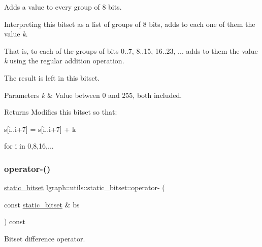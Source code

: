 Adds a value to every group of 8 bits. 

Interpreting this bitset as a list of groups of 8 bits, adds to each one of them the value {\itshape k}.

That is, to each of the groups of bits 0..7, 8..15, 16..23, ... adds to them the value {\itshape k} using the regular addition operation.

The result is left in this bitset. 
\begin{DoxyParams}{Parameters}
{\em k} & Value between 0 and 255, both included. \\
\hline
\end{DoxyParams}
\begin{DoxyReturn}{Returns}
Modifies this bitset so that\+: \begin{DoxyVerb}s[i..i+7] = s[i..i+7] + k
\end{DoxyVerb}
 for i in 0,8,16,... 
\end{DoxyReturn}
\mbox{\label{classlgraph_1_1utils_1_1static__bitset_ab7ab47c906e9e08a61a48bb935594e90}} 
\subsubsection{\texorpdfstring{operator-\/()}{operator-()}}
{\footnotesize\ttfamily \hyperlink{classlgraph_1_1utils_1_1static__bitset}{static\+\_\+bitset} lgraph\+::utils\+::static\+\_\+bitset\+::operator-\/ (\begin{DoxyParamCaption}\item[{const \hyperlink{classlgraph_1_1utils_1_1static__bitset}{static\+\_\+bitset} \&}]{bs }\end{DoxyParamCaption}) const}



Bitset difference operator. 


